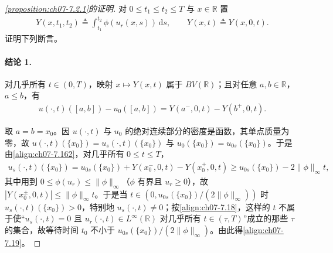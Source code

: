 \documentclass[../../main.tex]{subfiles}%
\begin{document}
\begin{proof}[\cref{proposition:ch07-7.2.1}的证明]
对 $0\leqslant t_1\leqslant t_2\leqslant T$ 与 $x\in\mathbb{R}$ 置
\begin{align*}
Y(x,t_1,t_2)\triangleq\int_{t_1}^{t_2}\phi(u_r(x,s))\,\mathrm{d}s,\qquad Y(x,t)\triangleq Y(x,0,t).
\end{align*}
证明下列断言。

\paragraph{结论 1.}
对几乎所有 $t\in(0,T)$，映射 $x\mapsto Y(x,t)$ 属于 $BV(\mathbb{R})$；且对任意 $a,b\in\mathbb{R}$，$a\leqslant b$，有
\begin{align}
u(\cdot,t)([a,b])-u_0([a,b])=Y(a^-,0,t)-Y(b^+,0,t). \label{align:ch07-7.162}
\end{align}

取 $a=b=x_0$。因 $u(\cdot,t)$ 与 $u_0$ 的绝对连续部分的密度是函数，其单点质量为零，故 $u(\cdot,t)(\{x_0\})=u_s(\cdot,t)(\{x_0\})$ 与 $u_0(\{x_0\})=u_{0s}(\{x_0\})$。于是由\eqref{align:ch07-7.162}，对几乎所有 $0\leqslant t\leqslant T$，
\begin{align*}
u_s(\cdot,t)(\{x_0\})=u_{0s}(\{x_0\})+Y(x_0^-,0,t)-Y(x_0^+,0,t)\geqslant u_{0s}(\{x_0\})-2\|\phi\|_\infty t,
\end{align*}
其中用到 $0\leqslant\phi(u_r)\leqslant\|\phi\|_\infty$（$\phi$ 有界且 $u_r\geqslant0$），故 $|Y(x_0^\pm,0,t)|\leqslant\|\phi\|_\infty t$。于是当 $t\in(0,u_{0s}(\{x_0\})/(2\|\phi\|_\infty))$ 时 $u_s(\cdot,t)(\{x_0\})>0$，特别地 $u_s(\cdot,t)\neq0$；按\eqref{align:ch07-7.18}，这样的 $t$ 不属于使“$u_s(\cdot,t)=0$ 且 $u_r(\cdot,t)\in L^\infty(\mathbb{R})$ 对几乎所有 $t\in(\tau,T)$”成立的那些 $\tau$ 的集合，故等待时间 $t_0$ 不小于 $u_{0s}(\{x_0\})/(2\|\phi\|_\infty)$。由此得\eqref{align:ch07-7.19}。


\end{proof}
\end{document}
